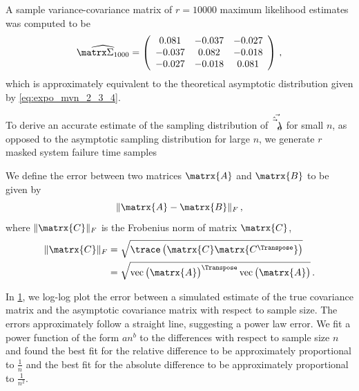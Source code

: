 \documentclass[../main.tex]{subfiles}
\begin{document}
A sample variance-covariance matrix of $r=10000$ maximum likelihood estimates 
was computed to be
\begin{equation}
    \widehat{\covn{1000}} =
    \left(
        \begin{array}{ccc}
            0.081  &   -0.037 &   -0.027\\
            -0.037 &   0.082  &   -0.018\\
            -0.027 &   -0.018 &   0.081
        \end{array}
    \right)\,,
\end{equation}
which is approximately equivalent to the theoretical asymptotic distribution given by \cref{eq:expo_mvn_2_3_4}.

\begin{figure}
\begin{center}

\end{center}
\end{figure}

To derive an accurate estimate of the sampling distribution of $\vec{\hat{\vec\lambda}_n}$ for small $n$, as opposed to the asymptotic sampling distribution for large $n$, we generate $r$ masked system failure time samples

\begin{figure}
\label{fig:frob_error}
\begin{center}

\end{center}
\end{figure}

We define the error between two matrices $\matrx{A}$ and $\matrx{B}$ to be given by
\begin{equation}
    \lVert \matrx{A} - \matrx{B} \rVert_F\,,
\end{equation}
where $\lVert \matrx{C} \rVert_F$ is the Frobenius norm of matrix $\matrx{C}$,
\begin{align}
    \lVert \matrx{C} \rVert_F
        &= \sqrt{\trace \left( \matrx{C} \matrx{C^\Transpose}\right)}\\
        &= \sqrt{\vt{\matrx{A}}^\Transpose \vt{\matrx{A}}}\,.
\end{align}

In \cref{fig:frob_error}, we log-log plot the error between a simulated estimate of the true covariance matrix and the asymptotic covariance matrix with respect to sample size. The errors approximately follow a straight line, suggesting a power law error. We fit a power function of the form $a n^b$ to the differences with respect to sample size $n$ and found the best fit for the relative difference to be approximately proportional to $\frac{1}{n}$ and the best fit for the absolute difference to be approximately proportional to $\frac{1}{n^2}$.
\end{document}
